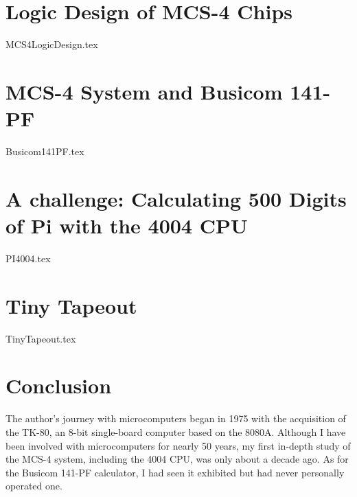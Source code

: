 \documentclass[dvipdfmx, a4paper,12pt]{book}
\begin{document}
\newpage\chapter{Logic Design of MCS-4 Chips}
{MCS4LogicDesign.tex}

\newpage\chapter{MCS-4 System and Busicom 141-PF}
{Busicom141PF.tex}

\newpage\chapter{A challenge: Calculating 500 Digits of Pi with the 4004 CPU}
{PI4004.tex}

\newpage\chapter{Tiny Tapeout}
{TinyTapeout.tex}

\newpage\chapter{Conclusion}
The author's journey with microcomputers began in 1975 with the acquisition of the TK-80, an 8-bit single-board computer based on the 8080A. Although I have been involved with microcomputers for nearly 50 years, my first in-depth study of the MCS-4 system, including the 4004 CPU, was only about a decade ago. As for the Busicom 141-PF calculator, I had seen it exhibited but had never personally operated one.
\end{document}
